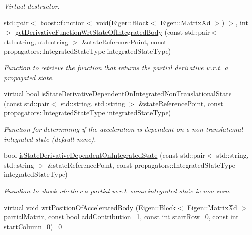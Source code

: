 \begin{DoxyCompactItemize}
\begin{DoxyCompactList}\small\item\em Virtual destructor. \end{DoxyCompactList}\item 
std\+::pair$<$ boost\+::function$<$ void(Eigen\+::\+Block$<$ Eigen\+::\+Matrix\+Xd $>$) $>$, int $>$ \hyperlink{classtudat_1_1acceleration__partials_1_1AccelerationPartial_a1f9e42e445f6efe61fd6db72826adc9d}{get\+Derivative\+Function\+Wrt\+State\+Of\+Integrated\+Body} (const std\+::pair$<$ std\+::string, std\+::string $>$ \&state\+Reference\+Point, const propagators\+::\+Integrated\+State\+Type integrated\+State\+Type)
\begin{DoxyCompactList}\small\item\em Function to retrieve the function that returns the partial derivative w.\+r.\+t. a propagated state. \end{DoxyCompactList}\item 
virtual bool \hyperlink{classtudat_1_1acceleration__partials_1_1AccelerationPartial_aac005cc281d426013544fcc77ec1b00d}{is\+State\+Derivative\+Dependent\+On\+Integrated\+Non\+Translational\+State} (const std\+::pair$<$ std\+::string, std\+::string $>$ \&state\+Reference\+Point, const propagators\+::\+Integrated\+State\+Type integrated\+State\+Type)
\begin{DoxyCompactList}\small\item\em Function for determining if the acceleration is dependent on a non-\/translational integrated state (default none). \end{DoxyCompactList}\item 
bool \hyperlink{classtudat_1_1acceleration__partials_1_1AccelerationPartial_ab05fd603c6228f4639e6f00ac4f9527c}{is\+State\+Derivative\+Dependent\+On\+Integrated\+State} (const std\+::pair$<$ std\+::string, std\+::string $>$ \&state\+Reference\+Point, const propagators\+::\+Integrated\+State\+Type integrated\+State\+Type)
\begin{DoxyCompactList}\small\item\em Function to check whether a partial w.\+r.\+t. some integrated state is non-\/zero. \end{DoxyCompactList}\item 
virtual void \hyperlink{classtudat_1_1acceleration__partials_1_1AccelerationPartial_a629ee1ab826d64e6493d1dbf0fe7586b}{wrt\+Position\+Of\+Accelerated\+Body} (Eigen\+::\+Block$<$ Eigen\+::\+Matrix\+Xd $>$ partial\+Matrix, const bool add\+Contribution=1, const int start\+Row=0, const int start\+Column=0)=0

\end{DoxyCompactItemize}
